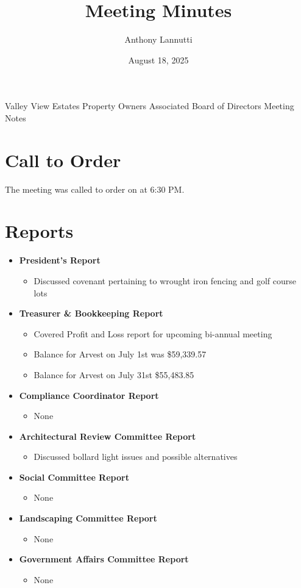\documentclass[12pt,a4paper]{article}
\author{Anthony Lannutti}
\date{August 18, 2025}
\title{Meeting Minutes}
\begin{document}
\begin{center}
  Valley View Estates Property Owners Associated Board of Directors Meeting Notes\break{}
  \@date{}
\end{center}

\section*{Call to Order}
\begin{flushleft}
The meeting was called to order on \@date{} at 6:30 PM\@.
\end{flushleft}


\section*{Reports}
\begin{itemize}
  \item \textbf{President's Report}
  \begin{itemize}
    \item Discussed covenant pertaining to wrought iron fencing and golf course lots 
  \end{itemize}
  \item \textbf{Treasurer \& Bookkeeping Report}
  \begin{itemize}
    \item Covered Profit and Loss report for upcoming bi-annual meeting
    \item Balance for Arvest on July 1st was \$59,339.57
    \item Balance for Arvest on July 31st \$55,483.85
  \end{itemize}
  \item \textbf{Compliance Coordinator Report}
  \begin{itemize}
    \item None
  \end{itemize}
  \item \textbf{Architectural Review Committee Report}
  \begin{itemize}
    \item Discussed bollard light issues and possible alternatives
  \end{itemize}
  \item \textbf{Social Committee Report}
  \begin{itemize}
    \item None
  \end{itemize}
  \item \textbf{Landscaping Committee Report}
  \begin{itemize}
    \item None
  \end{itemize}
  \item \textbf{Government Affairs Committee Report}
  \begin{itemize}
    \item None
  \end{itemize}
\end{itemize}
\end{document}
